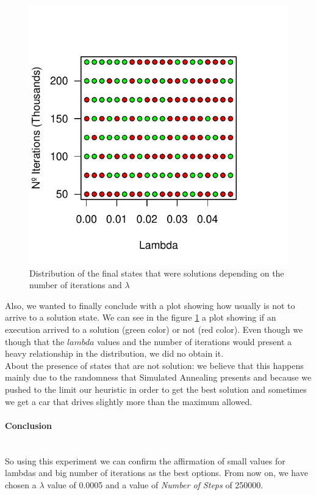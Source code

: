 \documentclass[12]{article}
\begin{document}
    
    \begin{figure}[H]
    \captionsetup{justification=centering}
     \centering
      \includegraphics[scale=0.8]{Results/data_B_4.pdf}
        \caption{Distribution of the final states that were solutions depending on the number of iterations and $\lambda$}
        \label{fig:data5}
    \end{figure}
      \vspace{1cm}
Also, we wanted to finally conclude with a plot showing how usually is not to arrive to a solution state. We can see in the figure \ref{fig:data5} a plot showing if an execution arrived to a solution (green color) or not (red color). Even though we though that the $lambda$ values and the number of iterations would present a heavy relationship in the distribution, we did no obtain it. 
 \\
 \medskip
About the presence of states that are not solution: we believe that this happens mainly due to the randomness that Simulated Annealing presents and because we pushed to the limit our heuristic in order to get the best solution and sometimes we get a car that drives slightly more than the maximum allowed. 


\paragraph{Conclusion}\mbox{}\\
So using this experiment we can confirm the affirmation of small values for lambdas and big number of iterations as the best options.
From now on, we have chosen a $\lambda$ value of 0.0005 and a value of \emph{Number of Steps} of 250000.
\end{document}
